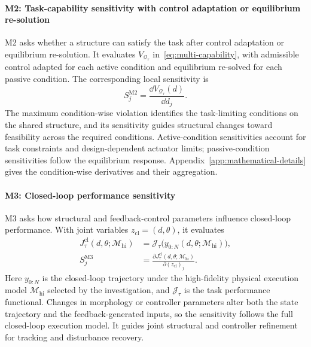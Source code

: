\paragraph{M2: Task-capability sensitivity with control adaptation or equilibrium re-solution}
M2 asks whether a structure can satisfy the task after control adaptation or equilibrium re-solution. It evaluates $V_{\mathcal Q_\tau}$ in~\eqref{eq:multi-capability}, with admissible control adapted for each active condition and equilibrium re-solved for each passive condition. The corresponding local sensitivity is
\begin{equation}
S_j^{\mathrm{M2}}=\frac{\dd V_{\mathcal Q_\tau}(d)}{\dd d_j}.
\label{eq:m2-sensitivity}
\end{equation}
The maximum condition-wise violation identifies the task-limiting conditions on the shared structure, and its sensitivity guides structural changes toward feasibility across the required conditions. Active-condition sensitivities account for task constraints and design-dependent actuator limits; passive-condition sensitivities follow the equilibrium response. Appendix~\ref{app:mathematical-details} gives the condition-wise derivatives and their aggregation.




\paragraph{M3: Closed-loop performance sensitivity}
M3 asks how structural and feedback-control parameters influence closed-loop performance. With joint variables $z_{\mathrm{cl}}=(d,\theta)$, it evaluates
\begin{equation}
\begin{aligned}
J_\tau^{\mathrm{cl}}(d,\theta;\mathcal M_{\mathrm{hi}})
&=\mathcal J_\tau\bigl(y_{0:N}(d,\theta;\mathcal M_{\mathrm{hi}})\bigr),\\
S_j^{\mathrm{M3}}&=\frac{\partial J_\tau^{\mathrm{cl}}(d,\theta;\mathcal M_{\mathrm{hi}})}{\partial(z_{\mathrm{cl}})_j}.
\end{aligned}
\label{eq:m3}
\end{equation}
Here $y_{0:N}$ is the closed-loop trajectory under the high-fidelity physical execution model $\mathcal M_{\mathrm{hi}}$ selected by the investigation, and $\mathcal J_\tau$ is the task performance functional. Changes in morphology or controller parameters alter both the state trajectory and the feedback-generated inputs, so the sensitivity follows the full closed-loop execution model. It guides joint structural and controller refinement for tracking and disturbance recovery.

